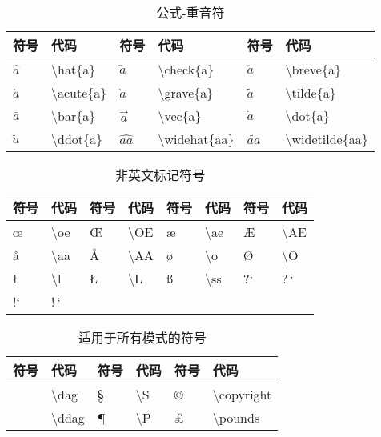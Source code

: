 \documentclass[UTF8,fontset=ubuntu]{ctexart}
\begin{document}
\begin{table}[H]
\begin{minipage}{\textwidth}
\begin{tabular}{l l l l l l}
	\hline
	符号 & 代码 & 符号 & 代码 & 符号 & 代码\\
	\hline
	$\hat{a}$ & \textbackslash  hat\{a\} & $\check{a}$ & \textbackslash  check\{a\} & $\breve{a}$ & \textbackslash  breve\{a\}\\
	$\acute{a}$ & \textbackslash  acute\{a\} & $\grave{a}$ & \textbackslash  grave\{a\} & $\tilde{a}$ & \textbackslash  tilde\{a\}\\
	$\bar{a}$ & \textbackslash  bar\{a\} & $\vec{a}$ & \textbackslash  vec\{a\} & $\dot{a}$ & \textbackslash  dot\{a\}\\
	 $\ddot{a}$ & \textbackslash  ddot\{a\} & $\widehat{aa}$ & \textbackslash  widehat\{aa\} & $\widetilde{aa}$ & \textbackslash  widetilde\{aa\}\\
	\hline
\end{tabular}
\end{minipage}
\caption{公式-重音符}
\end{table}

\begin{table}[H]
\begin{tabular}{l l l l l l l l}
	\hline
	符号 & 代码 & 符号 & 代码 & 符号 & 代码 & 符号 & 代码\\
	\hline
	\oe & \textbackslash  oe & \OE & \textbackslash  OE & \ae & \textbackslash  ae & \AE & \textbackslash  AE\\
	\aa & \textbackslash  aa & \AA & \textbackslash  AA & \o & \textbackslash  o & \O & \textbackslash  O\\
	\l & \textbackslash  l & \L & \textbackslash  L & \ss & \textbackslash  ss & ?` & ?\,`\\
	!` & !\,`\\
	\hline
\end{tabular}
\caption{非英文标记符号}
\end{table}

\begin{table}[H]
\begin{tabular}{l l l l l l}
	\hline
	符号 & 代码 & 符号 & 代码 & 符号 & 代码\\
	\hline
	\dag & \textbackslash  dag & \S & \textbackslash  S & \copyright & \textbackslash  copyright\\
	\ddag & \textbackslash  ddag & \P & \textbackslash  P & \pounds & \textbackslash  pounds\\
	\hline
\end{tabular}
\caption{适用于所有模式的符号}
\end{table}
\end{document}
